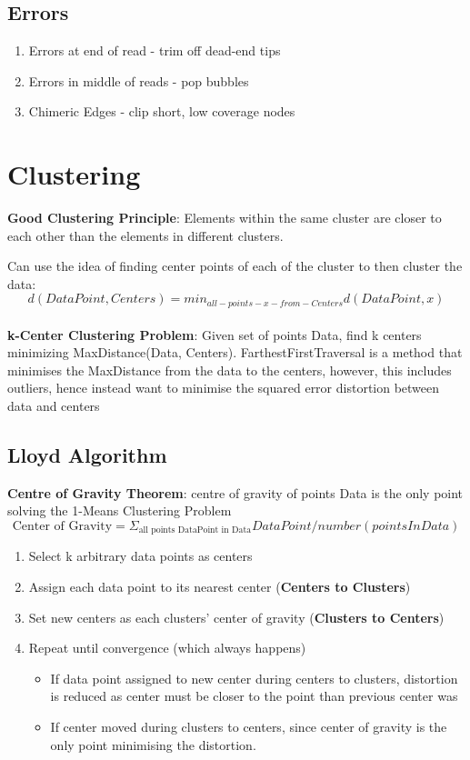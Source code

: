 \documentclass{article}
\newenvironment{cons}{\par\color{red}}{\par}
\begin{document}
\begin{cons}
\subsection{Errors}
\begin{enumerate}
    \item Errors at end of read - trim off dead-end tips
    \item Errors in middle of reads - pop bubbles
    \item Chimeric Edges - clip short, low coverage nodes
\end{enumerate}

\end{cons}

\section{Clustering}
\textbf{Good Clustering Principle}: Elements within the same cluster are closer to each other than the elements in different clusters.

Can use the idea of finding center points of each of the cluster to then cluster the data:
$$d(DataPoint, Centers) = min_{all-points-x-from-Centers}d(DataPoint, x)$$\\

\textbf{k-Center Clustering Problem}: Given set of points Data, find k centers minimizing MaxDistance(Data, Centers). FarthestFirstTraversal is a method that minimises the MaxDistance from the data to the centers, however, this includes outliers, hence instead want to minimise the squared error distortion between data and centers

\subsection{Lloyd Algorithm}
\textbf{Centre of Gravity Theorem}: centre of gravity of points Data is the only point solving the 1-Means Clustering Problem
$$\text{Center of Gravity} = \Sigma_{\text{all points DataPoint in Data}} DataPoint / number(pointsInData) $$


\begin{enumerate}
    \item Select k arbitrary data points as centers
    \item Assign each data point to its nearest center (\textbf{Centers to Clusters})
    \item Set new centers as each clusters' center of gravity (\textbf{Clusters to Centers})
    \item Repeat until convergence (which always happens)
    \begin{itemize}
        \item If data point assigned to new center during centers to clusters, distortion is reduced as center must be closer to the point than previous center was
        \item If center moved during clusters to centers, since center of gravity is the only point minimising the distortion.
    \end{itemize}
    
\end{enumerate}
\end{document}
